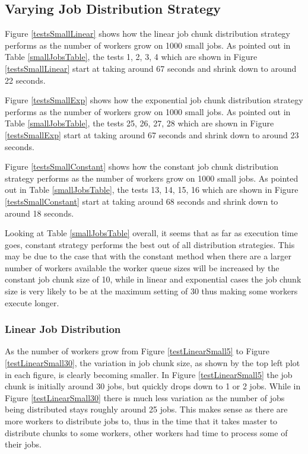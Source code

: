 \documentclass{article}
\begin{document}
\subsection{Varying Job Distribution Strategy} \label{smallJobDistribution}
Figure \ref{testsSmallLinear} shows how the linear job chunk distribution strategy performs as the number of workers grow on 1000 small jobs. As pointed out in Table \ref{smallJobsTable}, the tests 1, 2, 3, 4 which are shown in Figure \ref{testsSmallLinear} start at taking around 67 seconds and shrink down to around 22 seconds. 

Figure \ref{testsSmallExp} shows how the exponential job chunk distribution strategy performs as the number of workers grow on 1000 small jobs. As pointed out in Table \ref{smallJobsTable}, the tests 25, 26, 27, 28 which are shown in Figure \ref{testsSmallExp} start at taking around 67 seconds and shrink down to around 23 seconds.

Figure \ref{testsSmallConstant} shows how the constant job chunk distribution strategy performs as the number of workers grow on 1000 small jobs. As pointed out in Table \ref{smallJobsTable}, the tests 13, 14, 15, 16 which are shown in Figure \ref{testsSmallConstant} start at taking around 68 seconds and shrink down to around 18 seconds. 

Looking at Table \ref{smallJobsTable} overall, it seems that as far as execution time goes, constant strategy performs the best out of all distribution strategies. This may be due to the case that with the constant method when there are a larger number of workers available the worker queue sizes will be increased by the constant job chunk size of 10, while in linear and exponential cases the job chunk size is very likely to be at the maximum setting of 30 thus making some workers execute longer.

\subsubsection{Linear Job Distribution} \label{smallJobDistributionLinear}

As the number of workers grow from Figure \ref{testLinearSmall5} to Figure \ref{testLinearSmall30}, the variation in job chunk size, as shown by the top left plot in each figure, is clearly becoming smaller. In Figure \ref{testLinearSmall5} the job chunk is initially around 30 jobs, but quickly drops down to 1 or 2 jobs. While in Figure \ref{testLinearSmall30} there is much less variation as the number of jobs being distributed stays roughly around 25 jobs. This makes sense as there are more workers to distribute jobs to, thus in the time that it takes master to distribute chunks to some workers, other workers had time to process some of their jobs.
\end{document}
